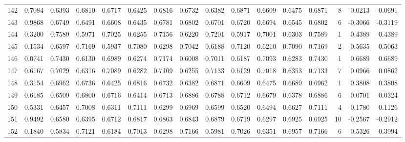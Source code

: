 \begin{tabular}{lrrrrrrrrrrrrrrr}
142 &      0.7084 &  0.6393 &  0.6810 &  0.6717 &  0.6425 &  0.6816 &  0.6732 &  0.6382 &  0.6871 &  0.6609 &   0.6475 &     0.6871 &      8 &                   -0.0213 &                    -0.0691 \\
143 &      0.9868 &  0.6749 &  0.6491 &  0.6608 &  0.6435 &  0.6781 &  0.6802 &  0.6701 &  0.6720 &  0.6694 &   0.6545 &     0.6802 &      6 &                   -0.3066 &                    -0.3119 \\
144 &      0.3200 &  0.7589 &  0.5971 &  0.7025 &  0.6255 &  0.7156 &  0.6220 &  0.7201 &  0.5917 &  0.7001 &   0.6303 &     0.7589 &      1 &                    0.4389 &                     0.4389 \\
145 &      0.1534 &  0.6597 &  0.7169 &  0.5937 &  0.7080 &  0.6298 &  0.7042 &  0.6188 &  0.7120 &  0.6210 &   0.7090 &     0.7169 &      2 &                    0.5635 &                     0.5063 \\
146 &      0.0741 &  0.7430 &  0.6130 &  0.6989 &  0.6274 &  0.7174 &  0.6008 &  0.7011 &  0.6187 &  0.7093 &   0.6283 &     0.7430 &      1 &                    0.6689 &                     0.6689 \\
147 &      0.6167 &  0.7029 &  0.6316 &  0.7089 &  0.6282 &  0.7109 &  0.6255 &  0.7133 &  0.6129 &  0.7018 &   0.6353 &     0.7133 &      7 &                    0.0966 &                     0.0862 \\
148 &      0.3154 &  0.6962 &  0.6736 &  0.6425 &  0.6816 &  0.6732 &  0.6382 &  0.6871 &  0.6609 &  0.6475 &   0.6689 &     0.6962 &      1 &                    0.3808 &                     0.3808 \\
149 &      0.6185 &  0.6509 &  0.6800 &  0.6716 &  0.6414 &  0.6713 &  0.6886 &  0.6788 &  0.6712 &  0.6679 &   0.6378 &     0.6886 &      6 &                    0.0701 &                     0.0324 \\
150 &      0.5331 &  0.6457 &  0.7008 &  0.6311 &  0.7111 &  0.6299 &  0.6969 &  0.6599 &  0.6520 &  0.6494 &   0.6627 &     0.7111 &      4 &                    0.1780 &                     0.1126 \\
151 &      0.9492 &  0.6580 &  0.6395 &  0.6712 &  0.6817 &  0.6863 &  0.6843 &  0.6879 &  0.6719 &  0.6297 &   0.6925 &     0.6925 &     10 &                   -0.2567 &                    -0.2912 \\
152 &      0.1840 &  0.5834 &  0.7121 &  0.6184 &  0.7013 &  0.6298 &  0.7166 &  0.5981 &  0.7026 &  0.6351 &   0.6957 &     0.7166 &      6 &                    0.5326 &                     0.3994 \\

\end{tabular}
